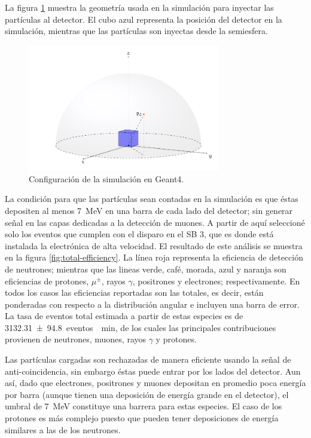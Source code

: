 La figura \ref{fig:sim-setup} muestra la geometría usada en la simulación para inyectar las partículas al detector. El cubo azul representa la posición del detector en la simulación, mientras que las partículas son inyectas desde la semiesfera.

\begin{figure}
        \centering
        \includegraphics[width=0.75\textwidth]{sim-setup.pdf}
        \caption{Configuración de la simulación en Geant4.}
        \label{fig:sim-setup}
\end{figure}

La condición para que las partículas sean contadas en la simulación es que éstas depositen al menos \SI{7}{\mega\electronvolt} en una barra de cada lado del detector; sin generar señal en las capas dedicadas a la detección de muones. A partir de aquí seleccioné solo los eventos que cumplen con el disparo en el SB \num{3}, que es donde está instalada la electrónica de alta velocidad. El resultado de este análisis se muestra en la figura \ref{fig:total-efficiency}. La línea roja representa la eficiencia de detección de neutrones; mientras que las lineas verde, café, morada, azul y naranja son eficiencias de protones, $\mu^{\pm}$, rayos $\gamma$, positrones y electrones; respectivamente. En todos los casos las eficiencias reportadas son las totales, es decir, están ponderadas con respecto a la distribución angular e incluyen una barra de error. La tasa de eventos total estimada a partir de estas especies es de \SI{3132.31(9480)}{eventos \per\minute}, de los cuales las principales contribuciones provienen de neutrones, muones, rayos $\gamma$ y protones.

Las partículas cargadas son rechazadas de manera eficiente usando la señal de anti-coincidencia, sin embargo éstas puede entrar por los lados del detector. Aun así, dado que electrones, positrones y muones depositan en promedio poca energía por barra (aunque tienen una deposición de energía grande en el detector), el umbral de \SI{7}{\mega\electronvolt} constituye una barrera para estas especies. El caso de los protones es más complejo puesto que pueden tener deposiciones de energía similares a las de los neutrones.

